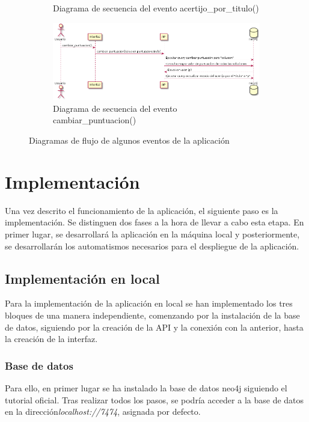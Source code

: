 \begin{figure}[hbtp]
\begin{subfigure}{.6\textwidth}
    \caption{Diagrama de secuencia del evento acertijo\_por\_titulo()} 
    \label{fig::acertijoportitulo}
\end{subfigure}
\begin{subfigure}{.6\textwidth}
     \centerline{\includegraphics[width=11cm]{figuras/cambiar_puntuacion.png}}
    \caption{Diagrama de secuencia del evento cambiar\_puntuacion()} 
    \label{fig::cambiarpuntuacion}
\end{subfigure}
\caption{Diagramas de flujo de algunos eventos de la aplicación }
\label{fig::secuencia}
\end{figure}


\section{Implementación}

Una vez descrito el funcionamiento de la aplicación, el siguiente paso es la implementación. Se distinguen dos fases a la hora de llevar a cabo esta etapa. En primer lugar, se desarrollará la aplicación en la máquina local y  posteriormente, se desarrollarán los automatismos necesarios para el despliegue de la aplicación.

\subsection{Implementación en local}

Para la implementación de la aplicación en local se han implementado los tres bloques de una manera independiente, comenzando por la instalación de la base de datos, siguiendo por la creación de la API y la conexión con la anterior, hasta la creación de la interfaz.

\subsubsection{Base de datos}

Para ello, en primer lugar se ha instalado la base de datos neo4j siguiendo el tutorial oficial. Tras realizar todos los pasos, se podría acceder a la base de datos en la dirección\textit{localhost://7474}, asignada por defecto\cite{neo4jinstall}.

